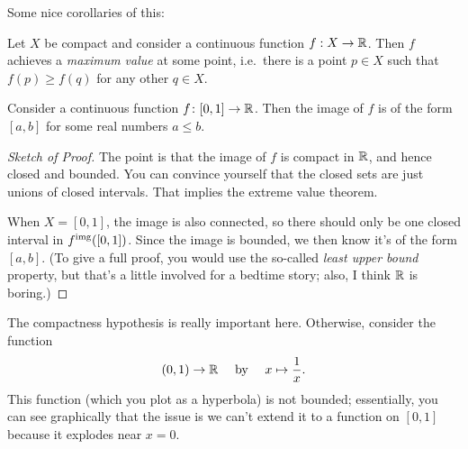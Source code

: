 Some nice corollaries of this:
\begin{corollary}
	Let $X$ be compact and consider a continuous function $f : X \to \mathbb R$.
	Then $f$ achieves a \emph{maximum value} at some point,
	i.e.\ there is a point $p \in X$ such that $f(p) \ge f(q)$ for any
	other $q \in X$.
\end{corollary}
\begin{corollary}
	Consider a continuous function $f \colon [0,1] \to \mathbb R$.
	Then the image of $f$ is of the form $[a,b]$ for some real numbers $a \le b$.
\end{corollary}

\begin{proof}[Sketch of Proof]
	The point is that the image of $f$ is compact in $\mathbb R$,
	and hence closed and bounded.
	You can convince yourself that the closed sets are just unions of closed intervals.
	That implies the extreme value theorem.

	When $X=[0,1]$, the image is also connected,
	so there should only be one closed interval in $f^{\text{img}}([0,1])$.
	Since the image is bounded, we then know it's of the form $[a,b]$.
	(To give a full proof, you would use the so-called \emph{least upper bound}
	property, but that's a little involved for a bedtime story;
	also, I think $\mathbb R$ is boring.)
\end{proof}

\begin{example}
	[$1/x$]
	The compactness hypothesis is really important here.
	Otherwise, consider the function
	\[ (0,1) \to \mathbb R \quad \text{ by } \quad
		x \mapsto \frac 1x. \]
	This function (which you plot as a hyperbola) is not bounded;
	essentially, you can see graphically that the issue
	is we can't extend it to a function on $[0,1]$ because it explodes near $x=0$.
\end{example}

